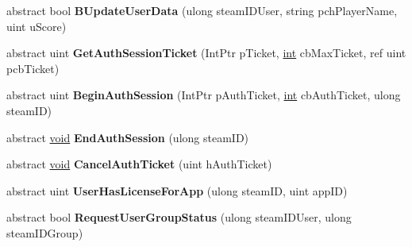 \begin{DoxyCompactItemize}
\item 
\hypertarget{classValve_1_1Steamworks_1_1ISteamGameServer_a8dad4928e8be8ee43e1cc1d3b0471fa6}{}abstract bool {\bfseries B\+Update\+User\+Data} (ulong steam\+I\+D\+User, string pch\+Player\+Name, uint u\+Score)\label{classValve_1_1Steamworks_1_1ISteamGameServer_a8dad4928e8be8ee43e1cc1d3b0471fa6}

\item 
\hypertarget{classValve_1_1Steamworks_1_1ISteamGameServer_aebb1cae492c4c14252c1f6785a2a2b77}{}abstract uint {\bfseries Get\+Auth\+Session\+Ticket} (Int\+Ptr p\+Ticket, \hyperlink{SDL__thread_8h_a6a64f9be4433e4de6e2f2f548cf3c08e}{int} cb\+Max\+Ticket, ref uint pcb\+Ticket)\label{classValve_1_1Steamworks_1_1ISteamGameServer_aebb1cae492c4c14252c1f6785a2a2b77}

\item 
\hypertarget{classValve_1_1Steamworks_1_1ISteamGameServer_a61b9607128c49a67d6eff8e1738c00a1}{}abstract uint {\bfseries Begin\+Auth\+Session} (Int\+Ptr p\+Auth\+Ticket, \hyperlink{SDL__thread_8h_a6a64f9be4433e4de6e2f2f548cf3c08e}{int} cb\+Auth\+Ticket, ulong steam\+I\+D)\label{classValve_1_1Steamworks_1_1ISteamGameServer_a61b9607128c49a67d6eff8e1738c00a1}

\item 
\hypertarget{classValve_1_1Steamworks_1_1ISteamGameServer_a9b4e62e72490543b62ed0e197c417c5c}{}abstract \hyperlink{SDL__audio_8h_a52835ae37c4bb905b903cbaf5d04b05f}{void} {\bfseries End\+Auth\+Session} (ulong steam\+I\+D)\label{classValve_1_1Steamworks_1_1ISteamGameServer_a9b4e62e72490543b62ed0e197c417c5c}

\item 
\hypertarget{classValve_1_1Steamworks_1_1ISteamGameServer_a04581c7faa24fb118f2a976a9254836b}{}abstract \hyperlink{SDL__audio_8h_a52835ae37c4bb905b903cbaf5d04b05f}{void} {\bfseries Cancel\+Auth\+Ticket} (uint h\+Auth\+Ticket)\label{classValve_1_1Steamworks_1_1ISteamGameServer_a04581c7faa24fb118f2a976a9254836b}

\item 
\hypertarget{classValve_1_1Steamworks_1_1ISteamGameServer_a8255b8ed791916b5d6ad1ed7eb51b329}{}abstract uint {\bfseries User\+Has\+License\+For\+App} (ulong steam\+I\+D, uint app\+I\+D)\label{classValve_1_1Steamworks_1_1ISteamGameServer_a8255b8ed791916b5d6ad1ed7eb51b329}

\item 
\hypertarget{classValve_1_1Steamworks_1_1ISteamGameServer_ab0c42bc0b480df9809fcbd7812a322a7}{}abstract bool {\bfseries Request\+User\+Group\+Status} (ulong steam\+I\+D\+User, ulong steam\+I\+D\+Group)\label{classValve_1_1Steamworks_1_1ISteamGameServer_ab0c42bc0b480df9809fcbd7812a322a7}


\end{DoxyCompactItemize}
